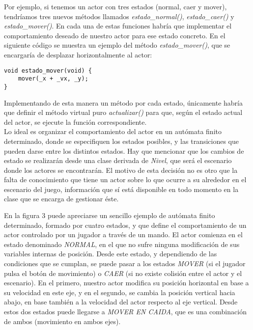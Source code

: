 Por ejemplo, si tenemos un actor con tres estados (normal, caer y mover), tendríamos tres nuevos métodos llamados \emph{estado\_normal()}, \emph{estado\_caer()} y \emph{estado\_mover()}. En cada una de estas funciones habría que implementar el comportamiento deseado de nuestro actor para ese estado concreto. En el siguiente código se muestra un ejemplo del método \emph{estado\_mover()}, que se encargaría de desplazar horizontalmente al actor:

\begin{lstlisting}[style=C++]
void estado_mover(void) {
    mover(_x + _vx, _y);
}
\end{lstlisting}

Implementando de esta manera un método por cada estado, únicamente habría que definir el método virtual puro \emph{actualizar()} para que, según el estado actual del actor, se ejecute la función correspondiente.\\

Lo ideal es organizar el comportamiento del actor en un autómata finito determinado, donde se especifiquen los estados posibles, y las transiciones que pueden darse entre los distintos estados. Hay que mencionar que los cambios de estado se realizarán desde una clase derivada de \emph{Nivel}, que será el escenario donde los actores se encontrarán. El motivo de esta decisión no es otro que la falta de conocimiento que tiene un actor sobre lo que ocurre a su alrededor en el escenario del juego, información que sí está disponible en todo momento en la clase que se encarga de gestionar éste.\\


En la figura 3 puede apreciarse un sencillo ejemplo de autómata finito determinado, formado por cuatro estados, y que define el comportamiento de un actor controlado por un jugador a través de un mando. El actor comienza en el estado denominado \emph{NORMAL}, en el que no sufre ninguna modificación de sus variables internas de posición. Desde este estado, y dependiendo de las condiciones que se cumplan, se puede pasar a los estados \emph{MOVER} (si el jugador pulsa el botón de movimiento) o \emph{CAER} (si no existe colisión entre el actor y el escenario). En el primero, nuestro actor modifica su posición horizontal en base a su velocidad en este eje, y en el segundo, se cambia la posición vertical hacia abajo, en base también a la velocidad del actor respecto al eje vertical. Desde estos dos estados puede llegarse a \emph{MOVER EN CAIDA}, que es una combinación de ambos (movimiento en ambos ejes).\\

